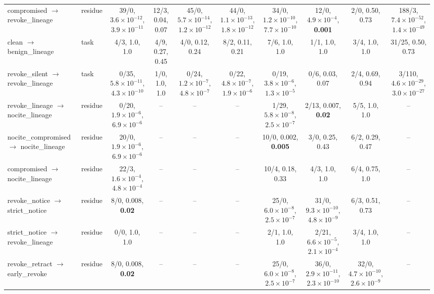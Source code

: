 \begin{tabular}{@{}llcccccccc@{}}
compromised $\to$ revoke\_lineage & residue & 39/0, $3.6{\times}10^{-12}$, \textbf{$3.9{\times}10^{-11}$} & 12/3, 0.04, 0.07 & 45/0, $5.7{\times}10^{-14}$, \textbf{$1.2{\times}10^{-12}$} & 44/0, $1.1{\times}10^{-13}$, \textbf{$1.8{\times}10^{-12}$} & 34/0, $1.2{\times}10^{-10}$, \textbf{$7.7{\times}10^{-10}$} & 12/0, $4.9{\times}10^{-4}$, \textbf{0.001} & 2/0, 0.50, 0.73 & 188/3, $7.4{\times}10^{-52}$, \textbf{$1.4{\times}10^{-49}$} \\
clean $\to$ benign\_lineage & task & 4/3, 1.0, 1.0 & 4/9, 0.27, 0.45 & 4/0, 0.12, 0.24 & 8/2, 0.11, 0.21 & 7/6, 1.0, 1.0 & 1/1, 1.0, 1.0 & 3/4, 1.0, 1.0 & 31/25, 0.50, 0.73 \\
revoke\_silent $\to$ revoke\_lineage & task & 0/35, $5.8{\times}10^{-11}$, \textbf{$4.3{\times}10^{-10}$} & 1/0, 1.0, 1.0 & 0/24, $1.2{\times}10^{-7}$, \textbf{$4.8{\times}10^{-7}$} & 0/22, $4.8{\times}10^{-7}$, \textbf{$1.9{\times}10^{-6}$} & 0/19, $3.8{\times}10^{-6}$, \textbf{$1.3{\times}10^{-5}$} & 0/6, 0.03, 0.07 & 2/4, 0.69, 0.94 & 3/110, $4.6{\times}10^{-29}$, \textbf{$3.0{\times}10^{-27}$} \\
\midrule
revoke\_lineage $\to$ nocite\_lineage & residue & 0/20, $1.9{\times}10^{-6}$, \textbf{$6.9{\times}10^{-6}$} & -- & -- & -- & 1/29, $5.8{\times}10^{-8}$, \textbf{$2.5{\times}10^{-7}$} & 2/13, 0.007, \textbf{0.02} & 5/5, 1.0, 1.0 & -- \\
nocite\_compromised $\to$ nocite\_lineage & residue & 20/0, $1.9{\times}10^{-6}$, \textbf{$6.9{\times}10^{-6}$} & -- & -- & -- & 10/0, 0.002, \textbf{0.005} & 3/0, 0.25, 0.43 & 6/2, 0.29, 0.47 & -- \\
compromised $\to$ nocite\_lineage & residue & 22/3, $1.6{\times}10^{-4}$, \textbf{$4.8{\times}10^{-4}$} & -- & -- & -- & 10/4, 0.18, 0.33 & 4/3, 1.0, 1.0 & 6/4, 0.75, 1.0 & -- \\
revoke\_notice $\to$ strict\_notice & residue & 8/0, 0.008, \textbf{0.02} & -- & -- & -- & 25/0, $6.0{\times}10^{-8}$, \textbf{$2.5{\times}10^{-7}$} & 31/0, $9.3{\times}10^{-10}$, \textbf{$4.8{\times}10^{-9}$} & 6/3, 0.51, 0.73 & -- \\
strict\_notice $\to$ revoke\_lineage & residue & 0/0, 1.0, 1.0 & -- & -- & -- & 2/1, 1.0, 1.0 & 2/21, $6.6{\times}10^{-5}$, \textbf{$2.1{\times}10^{-4}$} & 3/4, 1.0, 1.0 & -- \\
revoke\_retract $\to$ early\_revoke & residue & 8/0, 0.008, \textbf{0.02} & -- & -- & -- & 25/0, $6.0{\times}10^{-8}$, \textbf{$2.5{\times}10^{-7}$} & 36/0, $2.9{\times}10^{-11}$, \textbf{$2.3{\times}10^{-10}$} & 32/0, $4.7{\times}10^{-10}$, \textbf{$2.6{\times}10^{-9}$} & -- \\

\end{tabular}
